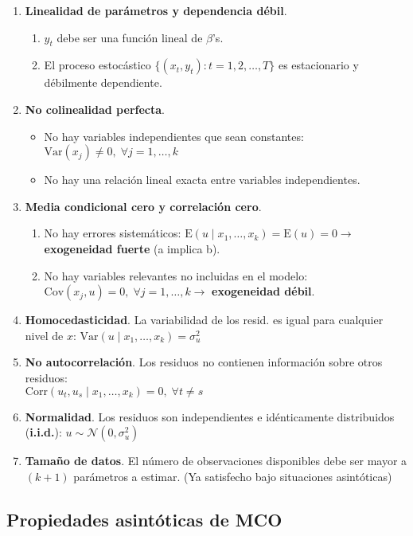 \documentclass[10pt, a4paper, landscape]{extarticle}
\newcommand{\E}{\mathrm{E}}
\newcommand{\Var}{\mathrm{Var}}
\newcommand{\Cov}{\mathrm{Cov}}
\newcommand{\Corr}{\mathrm{Corr}}
\begin{document}
\begin{multicols}{3}
\begin{enumerate}[leftmargin=*, label=t\arabic*.]
	\item \textbf{Linealidad de parámetros y dependencia débil}.
	\begin{enumerate}[leftmargin=*, label=\alph*.]
		\item $y_t$ debe ser una función lineal de $\beta$'s.
		\item El proceso estocástico $\lbrace(x_t, y_t) : t = 1, 2, \ldots, T\rbrace$ es estacionario y débilmente dependiente.
	\end{enumerate}
	\item \textbf{No colinealidad perfecta}.
	\begin{itemize}[leftmargin=*]
		\item No hay variables independientes que sean constantes: $\Var(x_j) \neq 0, \; \forall j = 1, \ldots, k$
		\item No hay una relación lineal exacta entre variables independientes.
	\end{itemize}
	\item \textbf{Media condicional cero y correlación cero}.
	\begin{enumerate}[leftmargin=*, label=\alph*.]
		\item No hay errores sistemáticos: $\E(u \mid x_1, \ldots, x_k) = \E(u) = 0 \rightarrow$ \textbf{exogeneidad fuerte} (a implica b).
		\item No hay variables relevantes no incluidas en el modelo: $\Cov(x_j , u) = 0, \; \forall j = 1, \ldots, k \rightarrow$ \textbf{exogeneidad débil}.
	\end{enumerate}
	\item \textbf{Homocedasticidad}. La variabilidad de los resid. es igual para cualquier nivel de $x$: $\Var(u \mid x_1, \ldots, x_k) = \sigma^2_u$
	\item \textbf{No autocorrelación}. Los residuos no contienen información sobre otros residuos: \\ $\Corr(u_t, u_s \mid x_1, \ldots, x_k) = 0, \; \forall t \neq s$
	\item \textbf{Normalidad}. Los residuos son independientes e idénticamente distribuidos (\textbf{i.i.d.}): $u \sim \mathcal{N} (0, \sigma^2_u)$
			\item \textbf{Tamaño de datos}. El número de observaciones disponibles debe ser mayor a $(k + 1)$ parámetros a estimar. (Ya satisfecho bajo situaciones asintóticas)
\end{enumerate}

\subsection*{Propiedades asintóticas de MCO}


\end{multicols}
\end{document}
